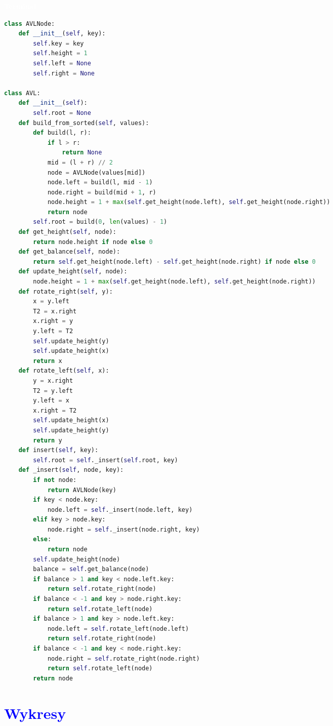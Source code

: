 \documentclass{article}
\begin{document}
\begin{multicols}{2}
		\noindent 
		
		\begin{tcolorbox}[colback=black,colframe=gray!50!,arc=3mm,boxrule=0pt,left=0pt,right=0pt,width=\linewidth, sharp corners=south]
			\textcolor{white}{\textbf{\textsf{Terminal}}}\\
			\scriptsize %
			\begin{lstlisting}[language=Python]
class AVLNode:
	def __init__(self, key):
		self.key = key
		self.height = 1
		self.left = None
		self.right = None
	
class AVL:
	def __init__(self):
		self.root = None
	def build_from_sorted(self, values):
		def build(l, r):
			if l > r:
				return None
			mid = (l + r) // 2
			node = AVLNode(values[mid])
			node.left = build(l, mid - 1)
			node.right = build(mid + 1, r)
			node.height = 1 + max(self.get_height(node.left), self.get_height(node.right))
			return node
		self.root = build(0, len(values) - 1)
	def get_height(self, node):
		return node.height if node else 0
	def get_balance(self, node):
		return self.get_height(node.left) - self.get_height(node.right) if node else 0
	def update_height(self, node):
		node.height = 1 + max(self.get_height(node.left), self.get_height(node.right))
	def rotate_right(self, y):
		x = y.left
		T2 = x.right
		x.right = y
		y.left = T2
		self.update_height(y)
		self.update_height(x)
		return x
	def rotate_left(self, x):
		y = x.right
		T2 = y.left
		y.left = x
		x.right = T2
		self.update_height(x)
		self.update_height(y)
		return y
	def insert(self, key):
		self.root = self._insert(self.root, key)
	def _insert(self, node, key):
		if not node:
			return AVLNode(key)
		if key < node.key:
			node.left = self._insert(node.left, key)
		elif key > node.key:
			node.right = self._insert(node.right, key)
		else:
			return node
		self.update_height(node)
		balance = self.get_balance(node)
		if balance > 1 and key < node.left.key:
			return self.rotate_right(node)
		if balance < -1 and key > node.right.key:
			return self.rotate_left(node)
		if balance > 1 and key > node.left.key:
			node.left = self.rotate_left(node.left)
			return self.rotate_right(node)
		if balance < -1 and key < node.right.key:
			node.right = self.rotate_right(node.right)
			return self.rotate_left(node)
		return node
			\end{lstlisting}
		\end{tcolorbox}
	\end{multicols}
	
	\newpage
	\section*{\textcolor{blue}{Wykresy}}
	
\end{document}
